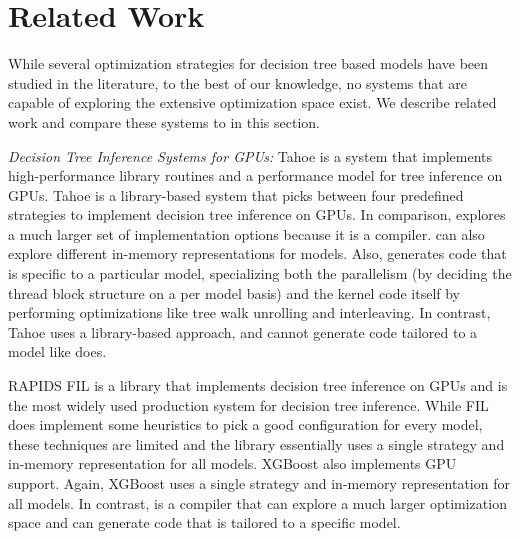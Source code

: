 \section{Related Work}
\label{Sec:Related}
While several optimization strategies for decision tree based models have been 
studied in the literature, to the best of our knowledge, no systems that are 
capable of exploring the extensive optimization space exist. We describe related work 
and compare these systems to \Treebeard{} in this section.

\emph{Decision Tree Inference Systems for GPUs:} 
Tahoe\cite{Tahoe} is a system that implements high-performance library routines and a 
performance model for tree inference on GPUs. Tahoe is a library-based system that picks 
between four predefined strategies to implement decision tree inference on GPUs.
In comparison, \Treebeard{} explores a much larger set of implementation options 
because it is a compiler. \Treebeard{} can also explore different in-memory 
representations for models. Also, \Treebeard{} generates code that is specific to 
a particular model, specializing both the parallelism (by deciding the thread block 
structure on a per model basis) and the kernel code itself by 
performing optimizations like tree walk unrolling and interleaving. In contrast, Tahoe 
uses a library-based approach, and cannot generate code tailored to a model 
like \Treebeard{} does.

RAPIDS FIL\cite{FIL} is a library that implements decision tree inference on GPUs
and is the most widely used production system for decision tree inference. While 
FIL does implement some heuristics to pick a good configuration for every model, 
these techniques are limited and the library essentially uses a single strategy 
and in-memory representation for all models. XGBoost \cite{XGBoost} also implements GPU 
support\cite{XGBGPU}. Again, XGBoost uses a single strategy and in-memory representation
for all models. In contrast, \Treebeard{} is a compiler that can explore a much larger
optimization space and can generate code that is tailored to a specific model.


